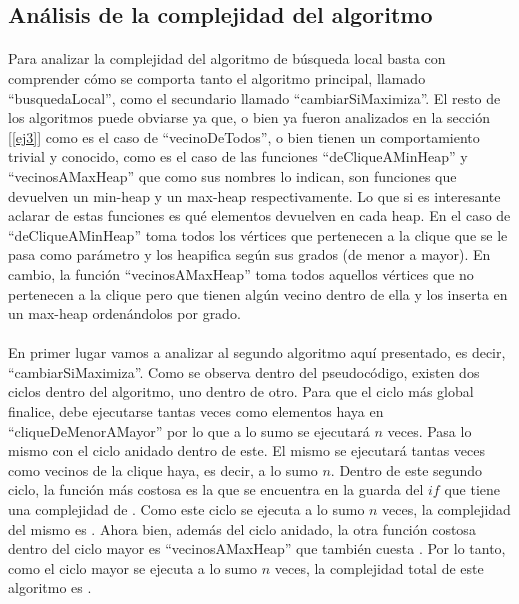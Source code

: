 \vspace{3em}



\normalsize
\subsection{Análisis de la complejidad del algoritmo}

\paragraph{}
Para analizar la complejidad del algoritmo de búsqueda local basta con comprender cómo se comporta tanto el algoritmo principal, llamado ``busquedaLocal'', como el secundario llamado ``cambiarSiMaximiza''. El resto de los algoritmos puede obviarse ya que, o bien ya fueron analizados en la sección [\ref{ej3}] como es el caso de ``vecinoDeTodos'', o bien tienen un comportamiento trivial y conocido, como es el caso de las funciones ``deCliqueAMinHeap'' y ``vecinosAMaxHeap'' que como sus nombres lo indican, son funciones que devuelven un min-heap y un max-heap respectivamente. Lo que si es interesante aclarar de estas funciones es qué elementos devuelven en cada heap. En el caso de ``deCliqueAMinHeap'' toma todos los vértices que pertenecen a la clique que se le pasa como parámetro y los heapifica según sus grados (de menor a mayor). En cambio, la función ``vecinosAMaxHeap'' toma todos aquellos vértices que no pertenecen a la clique pero que tienen algún vecino dentro de ella y los inserta en un max-heap ordenándolos por grado.

\paragraph{}
En primer lugar vamos a analizar al segundo algoritmo aquí presentado, es decir, ``cambiarSiMaximiza''. Como se observa dentro del pseudocódigo, existen dos ciclos dentro del algoritmo, uno dentro de otro. Para que el ciclo más global finalice, debe ejecutarse tantas veces como elementos haya en ``cliqueDeMenorAMayor'' por lo que a lo sumo se ejecutará $n$ veces. Pasa lo mismo con el ciclo anidado dentro de este. El mismo se ejecutará tantas veces como vecinos de la clique haya, es decir, a lo sumo $n$. Dentro de este segundo ciclo, la función más costosa es la que se encuentra en la guarda del $if$ que tiene una complejidad de . Como este ciclo se ejecuta a lo sumo $n$ veces, la complejidad del mismo es . Ahora bien, además del ciclo anidado, la otra función costosa dentro del ciclo mayor es ``vecinosAMaxHeap'' que también cuesta . Por lo tanto, como el ciclo mayor se ejecuta a lo sumo $n$ veces, la complejidad total de este algoritmo es .

